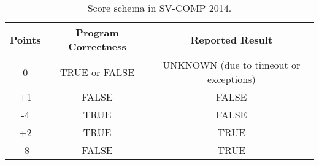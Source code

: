 \begin{table}
\caption{Score schema in SV-COMP 2014.\label{table:score-schema}}
\begin{center}
\begin{tabular}{|c|c|c|}
\hline
Points & Program Correctness & Reported Result \\\hline
0      & TRUE or FALSE & UNKNOWN (due to timeout or exceptions) \\
+1     & FALSE         & FALSE \\
-4     & TRUE          & FALSE \\
+2     & TRUE          & TRUE \\
-8     & FALSE         & TRUE \\\hline
\end{tabular}
\end{center}
\end{table}

